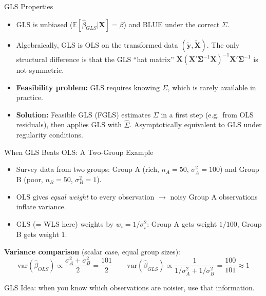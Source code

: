 \documentclass[aspectratio=169, handout]{beamer}
\numberwithin{equation}{section}
\begin{document}
\begin{frame}{GLS Properties}
\begin{itemize}
\item GLS is unbiased ($\mathbb{E}[\hat{\beta}_{GLS}|\bm{X}]=\beta$) and BLUE under the correct $\Sigma$.\pause
\item Algebraically, GLS is OLS on the transformed data $(\tilde{\bm{y}}, \tilde{\bm{X}})$. The only structural difference is that the GLS ``hat matrix'' $\bm{X}(\bm{X}'\bm{\Sigma}^{-1}\bm{X})^{-1}\bm{X}'\bm{\Sigma}^{-1}$ is not symmetric.\pause
\item \textbf{Feasibility problem:} GLS requires knowing $\Sigma$, which is rarely available in practice.\pause
\item \textbf{Solution:} Feasible GLS (FGLS) estimates $\Sigma$ in a first step (e.g.\ from OLS residuals), then applies GLS with $\hat{\Sigma}$. Asymptotically equivalent to GLS under regularity conditions.
\end{itemize}
\end{frame}

\begin{frame}{When GLS Beats OLS: A Two-Group Example}
\begin{itemize}\setlength{\itemsep}{1pt}
\item Survey data from two groups: Group A (rich, $n_A=50$, $\sigma_A^2=100$) and Group B (poor, $n_B=50$, $\sigma_B^2=1$).
\item OLS gives \emph{equal weight} to every observation $\to$ noisy Group A observations inflate variance.
\item GLS (= WLS here) weights by $w_i=1/\sigma_i^2$: Group A gets weight $1/100$, Group B gets weight $1$.
\end{itemize}
\smallskip
\textbf{Variance comparison} (scalar case, equal group sizes):
$$\text{var}(\hat{\beta}_{OLS})\propto \frac{\sigma_A^2+\sigma_B^2}{2}=\frac{101}{2}\qquad \text{var}(\hat{\beta}_{GLS})\propto \frac{1}{1/\sigma_A^2+1/\sigma_B^2}=\frac{100}{101}\approx 1$$
\vspace{-0.5em}
\begin{tcolorbox}[colback=blue!5, colframe=blue!50, boxsep=2pt, top=2pt, bottom=2pt]
GLS Idea: when you know which observations are noisier, use that information.
\end{tcolorbox}
\end{frame}
\end{document}
